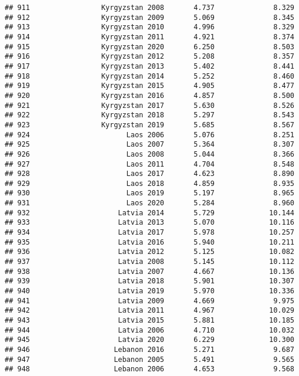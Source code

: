 \documentclass[
]{article}
\begin{document}
\begin{verbatim}
## 911                 Kyrgyzstan 2008       4.737              8.329
## 912                 Kyrgyzstan 2009       5.069              8.345
## 913                 Kyrgyzstan 2010       4.996              8.329
## 914                 Kyrgyzstan 2011       4.921              8.374
## 915                 Kyrgyzstan 2020       6.250              8.503
## 916                 Kyrgyzstan 2012       5.208              8.357
## 917                 Kyrgyzstan 2013       5.402              8.441
## 918                 Kyrgyzstan 2014       5.252              8.460
## 919                 Kyrgyzstan 2015       4.905              8.477
## 920                 Kyrgyzstan 2016       4.857              8.500
## 921                 Kyrgyzstan 2017       5.630              8.526
## 922                 Kyrgyzstan 2018       5.297              8.543
## 923                 Kyrgyzstan 2019       5.685              8.567
## 924                       Laos 2006       5.076              8.251
## 925                       Laos 2007       5.364              8.307
## 926                       Laos 2008       5.044              8.366
## 927                       Laos 2011       4.704              8.548
## 928                       Laos 2017       4.623              8.890
## 929                       Laos 2018       4.859              8.935
## 930                       Laos 2019       5.197              8.965
## 931                       Laos 2020       5.284              8.960
## 932                     Latvia 2014       5.729             10.144
## 933                     Latvia 2013       5.070             10.116
## 934                     Latvia 2017       5.978             10.257
## 935                     Latvia 2016       5.940             10.211
## 936                     Latvia 2012       5.125             10.082
## 937                     Latvia 2008       5.145             10.112
## 938                     Latvia 2007       4.667             10.136
## 939                     Latvia 2018       5.901             10.307
## 940                     Latvia 2019       5.970             10.336
## 941                     Latvia 2009       4.669              9.975
## 942                     Latvia 2011       4.967             10.029
## 943                     Latvia 2015       5.881             10.185
## 944                     Latvia 2006       4.710             10.032
## 945                     Latvia 2020       6.229             10.300
## 946                    Lebanon 2016       5.271              9.687
## 947                    Lebanon 2005       5.491              9.565
## 948                    Lebanon 2006       4.653              9.568

\end{verbatim}
\end{document}
